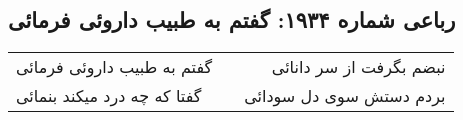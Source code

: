 \begin{center}
\section*{رباعی شماره ۱۹۳۴: گفتم به طبیب داروئی فرمائی}
\label{sec:1934}
\begin{longtable}{l p{0.5cm} r}
گفتم به طبیب داروئی فرمائی
&&
نبضم بگرفت از سر دانائی
\\
گفتا که چه درد میکند بنمائی
&&
بردم دستش سوی دل سودائی
\\
\end{longtable}
\end{center}
